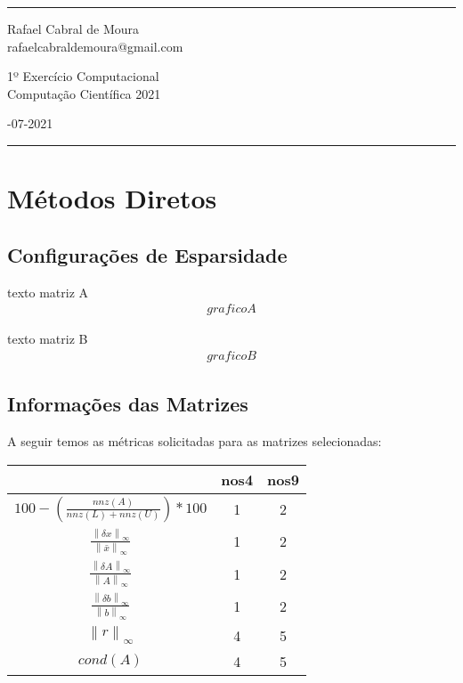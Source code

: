 \documentclass[a4paper]{article}
\begin{document}

\fancyhead[C]{}
\hrule \medskip %
\begin{minipage}{0.295\textwidth} 
\raggedright
\footnotesize
Rafael Cabral de Moura \hfill\\
rafaelcabraldemoura@gmail.com
\end{minipage}
\begin{minipage}{0.4\textwidth} 
\centering 
\large 
1º Exercício Computacional \\ 
\normalsize 
Computação Científica 2021 \\
\end{minipage}
\begin{minipage}{0.295\textwidth} 
-07-2021\hfill\\
\end{minipage}
\medskip\hrule 
\bigskip


\section{Métodos Diretos}

\subsection{Configurações de Esparsidade}

texto matriz A
\begin{align*}
grafico A
\end{align*}

texto matriz B
\begin{align*}
grafico B
\end{align*}

\subsection{Informações das Matrizes}
A seguir temos as métricas solicitadas para as matrizes selecionadas:

\def\arraystretch{1.3}
\begin{table}[ht]
\centering
\begin{tabular}[t]{ccc}
\hline
&nos4&nos9\\
\hline
$ 100 - \left ( \frac{nnz(A)}{nnz(L)+nnz(U)} \right )*100 $                     & 1 & 2\\
$\frac{\left \| \delta x \right \|_\infty}{\left \| \bar x \right \|_\infty}$   & 1 & 2\\
$\frac{\left \| \delta A \right \|_\infty}{\left \| A \right \|_\infty}$        & 1 & 2\\
$\frac{\left \| \delta b \right \|_\infty}{\left \| b \right \|_\infty}$        & 1 & 2\\
$\left \| r \right \|_\infty $                                                  & 4 & 5\\
$cond(A)$                                                                       & 4 & 5\\
\hline
\end{tabular}
\end{table}
\end{document}
